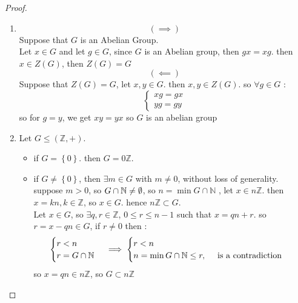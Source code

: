 \begin{proof}
  \begin{enumerate}
  \item 
\[
( \implies ) 
\]
Suppose that $G $ is an Abelian Group. \\
Let $x \in  G $ and let $g \in G $, since $G $ is an Abelian group, then $gx = xg $. then $x \in  Z(G)$,
then $Z(G) = G$
\[
 ( \impliedby  ) 
\]
Suppose that $Z(G) = G$, let $x,y \in  G$. then $x,y \in Z(G)$. so $\forall g \in G$ :
\[
\begin{cases}
xg = gx \\
yg = gy
\end{cases}
\]
so for $g = y$, we get $xy = yx $ so $G $ is an abelian group 
\item 
  Let $G \leq (\mathbb{Z}, +)  $.  
  \begin{itemize}
    \item       if $G = \left\{ 0 \right\} $. then $G = 0 \mathbb{Z} $. 
      \item
  if $G \neq \left\{ 0 \right\} $, then $\exists m \in G $ with $m \neq 0$, without loss of generality.
  suppose $m > 0$, so $G \cap  \mathbb{N} \neq  \emptyset $, so $n = \min G \cap \mathbb{N} $ , let $x \in  n \mathbb{Z} $.
  then $x = kn, k \in  \mathbb{Z}$, so $x \in  G $. hence $n \mathbb{Z} \subset G $. \\
  Let $x \in  G $, so $\exists q,r \in  \mathbb{Z}$, $0 \leq r \leq  n-1$ such that 
  $x = qn + r $. so $r = x - qn \in  G $, if $r \neq  0 $ then : 
  \[
  \begin{cases}
  r < n \\
  r = G \cap \mathbb{N}
  \end{cases} \implies 
  \begin{cases}
  r < n \\
  n = \min  G \cap \mathbb{N} \leq r, \quad \text{ is a contradiction } 
  \end{cases}
  \]
  so $x = qn \in  n \mathbb{Z} $, so $G \subset n \mathbb{Z}$ 
  \end{itemize}
  \end{enumerate}
\end{proof}

